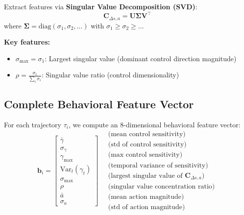 \documentclass[11pt,a4paper]{article}
\newcommand{\vect}[1]{\mathbf{#1}}
\newcommand{\mat}[1]{\mathbf{#1}}
\begin{document}
Extract features via \textbf{Singular Value Decomposition (SVD)}:
\begin{equation}
    \mat{C}_{\Delta s, a} = \mat{U} \boldsymbol{\Sigma} \mat{V}^\top
\end{equation}
where $\boldsymbol{\Sigma} = \text{diag}(\sigma_1, \sigma_2, \ldots)$ with $\sigma_1 \geq \sigma_2 \geq \ldots$

\textbf{Key features:}
\begin{itemize}
    \item $\sigma_{\max} = \sigma_1$: Largest singular value (dominant control direction magnitude)
    \item $\rho = \frac{\sigma_1}{\sum_i \sigma_i}$: Singular value ratio (control dimensionality)
\end{itemize}

\subsection{Complete Behavioral Feature Vector}

For each trajectory $\tau_i$, we compute an 8-dimensional behavioral feature vector:
\begin{equation}
    \vect{b}_i = \begin{bmatrix}
        \bar{\gamma} \\
        \sigma_\gamma \\
        \gamma_{\max} \\
        \text{Var}_t(\gamma_t) \\
        \sigma_{\max} \\
        \rho \\
        \bar{a} \\
        \sigma_a
    \end{bmatrix}
    \quad
    \begin{array}{l}
        \text{(mean control sensitivity)} \\
        \text{(std of control sensitivity)} \\
        \text{(max control sensitivity)} \\
        \text{(temporal variance of sensitivity)} \\
        \text{(largest singular value of } \mat{C}_{\Delta s, a}) \\
        \text{(singular value concentration ratio)} \\
        \text{(mean action magnitude)} \\
        \text{(std of action magnitude)}
    \end{array}
\end{equation}
\end{document}
